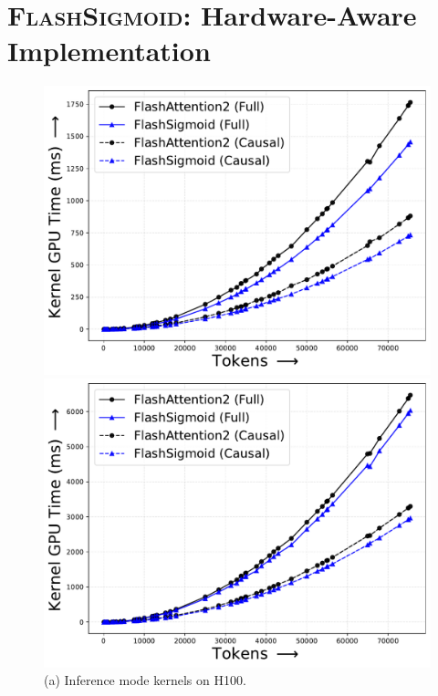 \section{\textsc{FlashSigmoid}: Hardware-Aware Implementation}
\label{sec:FlashSigmoidHardwareAwareImplementation}
\begin{figure}[!thbp]
    \centering
    \begin{minipage}{0.45\textwidth}
        \footnotesize
        \centering
        \includegraphics[trim={0 0 0 0}, width=\textwidth]{figures/_flash_figures/final_arxiv/main/H100_noalibi_FWD_Full_17.39_0.07_Causal_18.76_0.06.pdf}
        \captionsetup{justification=centering} 
        \caption*{(a) Inference mode kernels on H100.}
    \end{minipage}
    \hfill
    \begin{minipage}{0.45\textwidth}
        \centering        
        \includegraphics[trim={{0 0 0 0}}, width=\textwidth]{figures/_flash_figures/final_arxiv/main/H100_noalibi_FWDBWD_Full_6.53_0.06_Causal_9.46_0.04.pdf}

\end{minipage}
\end{figure}
